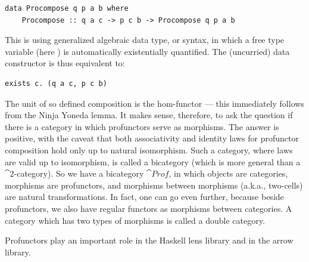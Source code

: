 \begin{Verbatim}
data Procompose q p a b where
    Procompose :: q a c -> p c b -> Procompose q p a b 
\end{Verbatim}
This is using generalized algebraic data type, or  syntax, in which
a free type variable (here ) is automatically existentially
quantified. The (uncurried) data constructor  is
thus equivalent to:

\begin{Verbatim}
exists c. (q a c, p c b)
\end{Verbatim}
The unit of so defined composition is the hom-functor --- this
immediately follows from the Ninja Yoneda lemma. It makes sense,
therefore, to ask the question if there is a category in which
profunctors serve as morphisms. The answer is positive, with the caveat
that both associativity and identity laws for profunctor composition
hold only up to natural isomorphism. Such a category, where laws are
valid up to isomorphism, is called a bicategory (which is more general
than a $\cat{2}$-category). So we have a bicategory $\cat{Prof}$, in which
objects are categories, morphisms are profunctors, and morphisms between
morphisms (a.k.a., two-cells) are natural transformations. In fact, one
can go even further, because beside profunctors, we also have regular
functors as morphisms between categories. A category which has two types
of morphisms is called a double category.

Profunctors play an important role in the Haskell lens library and in
the arrow library.
